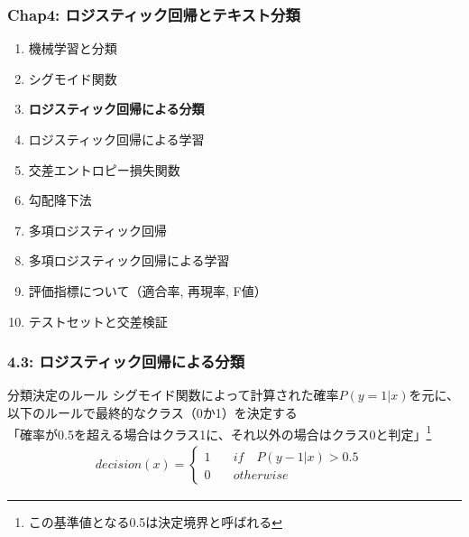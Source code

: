 \documentclass[unicode,11pt]{beamer} %
\begin{document}

\begin{frame}
    \frametitle{Chap4: ロジスティック回帰とテキスト分類}
    \begin{block}{}
        \begin{enumerate}
            \item 機械学習と分類
            \item シグモイド関数
            \item {\color{red}\textbf{ロジスティック回帰による分類}}
            \item ロジスティック回帰による学習
            \item 交差エントロピー損失関数
            \item 勾配降下法
            \item 多項ロジスティック回帰
            \item 多項ロジスティック回帰による学習
            \item 評価指標について（適合率, 再現率, F値）
            \item テストセットと交差検証
        \end{enumerate}
    \end{block}
\end{frame}

\begin{frame}
    \frametitle{4.3: ロジスティック回帰による分類}
    \begin{alertblock}{分類決定のルール}
        シグモイド関数によって計算された確率$P(y = 1|x)$を元に、以下のルールで最終的なクラス（0か1）を決定する
        \\「確率が0.5を超える場合はクラス1に、それ以外の場合はクラス0と判定」\footnote{この基準値となる0.5は決定境界と呼ばれる}
        \begin{eqnarray*}
            decision(x) = 
            \left\{
            \begin{alignedat}{2}
                1 \quad &if \quad P(y-1|x) > 0.5& \\
                0 \quad &otherwise&
            \end{alignedat}
            \right.
        \end{eqnarray*}
    \end{alertblock}
\end{frame}
\end{document}
